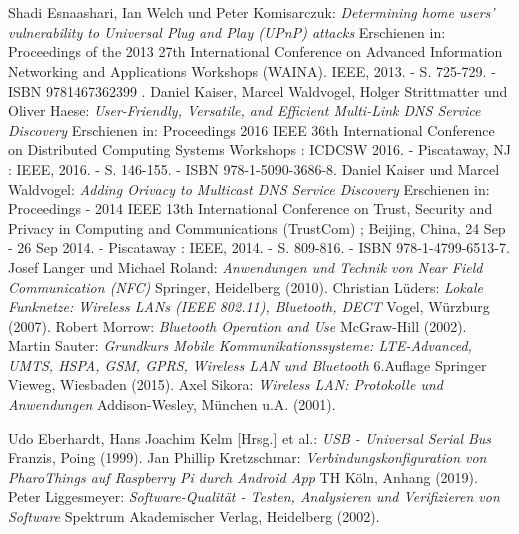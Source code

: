     \pagebreak
    \section*{\contentsname}
    \startcontents
	\pagebreak
	
    
    
    
    
    
    

    \lstlistoflistings
    \listoffigures
    \pagebreak
    
    \renewcommand\refname{Literaturverzeichnis}
    \begin{thebibliography}{10}
         Shadi Esnaashari, Ian Welch und Peter Komisarczuk: {\it Determining home users' vulnerability to Universal Plug and Play (UPnP) attacks} Erschienen in: Proceedings of the 2013 27th International Conference on Advanced Information Networking and Applications Workshops (WAINA). IEEE, 2013. - S. 725-729. - ISBN 9781467362399 .
         Daniel Kaiser, Marcel Waldvogel, Holger Strittmatter und Oliver Haese: {\it User-Friendly, Versatile, and Efficient Multi-Link DNS Service Discovery} Erschienen in: Proceedings 2016 IEEE 36th International Conference on Distributed Computing Systems Workshops : ICDCSW 2016. - Piscataway, NJ : IEEE, 2016. - S. 146-155. - ISBN 978-1-5090-3686-8.
         Daniel Kaiser und Marcel Waldvogel: {\it Adding Orivacy to Multicast DNS Service Discovery} Erschienen in: Proceedings - 2014 IEEE 13th International Conference on Trust, Security and Privacy in Computing and Communications (TrustCom) ; Beijing, China, 24 Sep - 26 Sep 2014. - Piscataway : IEEE, 2014. - S. 809-816. - ISBN 978-1-4799-6513-7.
        Josef Langer und Michael Roland: {\it Anwendungen und Technik von Near Field Communication (NFC)} Springer, Heidelberg (2010).
        Christian Lüders: {\it Lokale Funknetze: Wireless LANs (IEEE 802.11), Bluetooth, DECT} Vogel, Würzburg (2007).
        Robert Morrow: {\it Bluetooth Operation and Use} McGraw-Hill (2002).
        Martin Sauter: {\it Grundkurs Mobile Kommunikationssysteme: LTE-Advanced, UMTS, HSPA, GSM, GPRS, Wireless LAN und Bluetooth} 6.Auflage Springer Vieweg, Wiesbaden (2015).
        Axel Sikora: {\it Wireless LAN: Protokolle und Anwendungen} Addison-Wesley, München u.A. (2001).
        
         Udo Eberhardt, Hans Joachim Kelm [Hrsg.] et al.: {\it USB - Universal Serial Bus} Franzis, Poing (1999).
		 Jan Phillip Kretzschmar: {\it Verbindungskonfiguration von PharoThings auf Raspberry Pi durch Android App} TH Köln, Anhang (2019).
		 Peter Liggesmeyer: {\it Software-Qualität - Testen, Analysieren und Verifizieren von Software} Spektrum Akademischer Verlag, Heidelberg (2002).
    \end{thebibliography}
